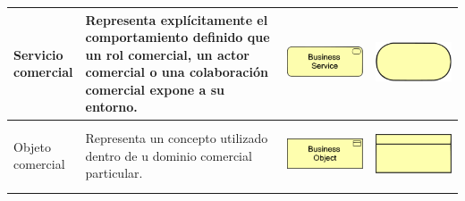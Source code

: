 \begin{longtable}{|p{0.15\linewidth}|p{0.45\linewidth}|p{0.2\linewidth} p{0.2\linewidth}|}
    Servicio comercial
    &
    Representa explícitamente el comportamiento definido que un rol comercial, un actor comercial o una colaboración comercial expone a su entorno.
    &
\begin{center}
    \includegraphics[width=1\linewidth]{imgs/capa_de_negocios/9.pdf}
\end{center} &
\begin{center}
    \includegraphics[width=0.5\linewidth]{imgs/capa_de_negocios/a9.pdf}
\end{center}
    \\ \hline

    Objeto comercial
    &
    Representa un concepto utilizado dentro de u dominio comercial particular.
    &
\begin{center}
    \includegraphics[width=1\linewidth]{imgs/capa_de_negocios/10.pdf}
\end{center} &
\begin{center}
    \includegraphics[width=0.5\linewidth]{imgs/capa_de_negocios/a10.pdf}
\end{center}
    \\ \hline


\end{longtable}
